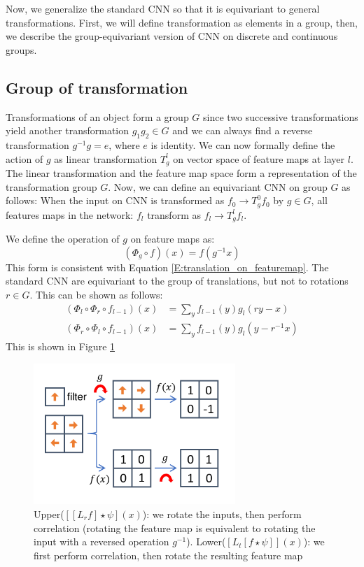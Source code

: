 \documentclass{IEEEtran}
\begin{document}
Now, we generalize the standard CNN so that it is equivariant to general transformations. First, we will define transformation 
as elements in a group, then, we describe the group-equivariant version of CNN on discrete and continuous groups. 

\subsection*{Group of transformation}
Transformations of an object form a group $G$ since 
two successive transformations yield another transformation $g_1g_2\in G$ and 
we can always find a reverse transformation $g^{-1}g = e$, where $e$ is identity. We can now formally define the 
action of $g$ as linear transformation $T_g^l$ on vector space of feature maps at layer $l$. The linear transformation 
and the feature map space form a representation of the transformation group $G$. 
Now, we can define an equivariant CNN on group $G$ as follows: 
When the input on CNN is transformed as $f_0\to T_g^0f_0$ by $g\in G$, all features maps 
in the network: $f_l$ transform as $f_l \to T_g^lf_l$. 

We define the operation of $g$ on feature maps as: 
\begin{equation}
    \label{E:g_on_featuremap}
    (\Phi_g \circ f) (x) = f(g^{-1}x)
\end{equation}
This form is consistent with Equation \eqref{E:translation_on_featuremap}.
The standard CNN are equivariant to the group of translations, but not to rotations $r\in G$. This can be shown as follows:
\begin{align*}
    (\Phi_l \circ \Phi_r \circ f_{l-1}) (x) &= \sum_{y} f_{l-1}(y) g_l(ry-x) \\
    (\Phi_r \circ \Phi_l \circ f_{l-1}) (x) &= \sum_{y} f_{l-1}(y) g_l(y-r^{-1}x)
\end{align*}
This is shown in Figure \ref{F:rotation_is_not_equivariance}
\begin{figure}[h!]
    \centering
    \includegraphics[width=3in]{figures/rotation_equivariance.pdf}
    \caption{
        Upper($[[L_r f]\star \psi] (x)$): we rotate the inputs, then perform correlation (rotating the feature map is equivalent to rotating the input with a reversed operation $g^{-1}$).
        Lower($[L_t[f\star \psi] ] (x)$): we first perform correlation, then rotate the resulting feature map }
    \label{F:rotation_is_not_equivariance}
\end{figure}
\end{document}
